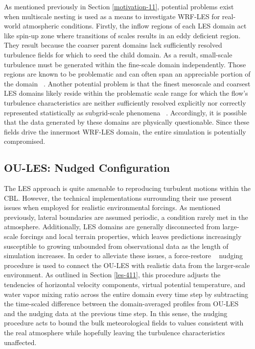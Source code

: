 As mentioned previously in Section \autoref{motivation-11}, potential problems exist when multiscale nesting is used as a means to investigate WRF-LES for real-world atmospheric conditions. Firstly, the inflow regions of each LES domain act like spin-up zone where transitions of scales results in an eddy deficient region. They result because the coarser parent domains lack sufficiently resolved turbulence fields for which to seed the child domain. As a result, small-scale turbulence must be generated within the fine-scale domain independently. Those regions are known to be problematic and can often span an appreciable portion of the domain ~\citep{Gaudet2012}. Another potential problem is that the finest mesoscale and coarsest LES domains likely reside within the problematic scale range for which the flow's turbulence characteristics are neither sufficiently resolved explicitly nor correctly represented statistically as subgrid-scale phenomena ~\citep{Wyngaard2004}. Accordingly, it is possible that the data generated by these domains are physically questionable. Since these fields drive the innermost WRF-LES domain, the entire simulation is potentially compromised.

\subsection{OU-LES: Nudged Configuration}
\label{nudge-611}

The LES approach is quite amenable to reproducing turbulent motions within the CBL. However, the technical implementations surrounding their use present issues when employed for realistic environmental forcings. As mentioned previously, lateral boundaries are assumed periodic, a condition rarely met in the atmosphere. Additionally, LES domains are generally disconnected from large-scale forcings and local terrain properties, which leaves predictions increasingly susceptible to growing unbounded from observational data as the length of simulation increases. In order to alleviate these issues, a force-restore ~\citep{Botnick2008} nudging procedure is used to connect the OU-LES with realistic data from the larger-scale environment. As outlined in Section \autoref{les-411}, this procedure adjusts the tendencies of horizontal velocity components, virtual potential temperature, and water vapor mixing ratio across the entire domain every time step by subtracting the time-scaled difference between the domain-averaged profiles from OU-LES and the nudging data at the previous time step. In this sense, the nudging procedure acts to bound the bulk meteorological fields to values consistent with the real atmosphere while hopefully leaving the turbulence characteristics unaffected.

